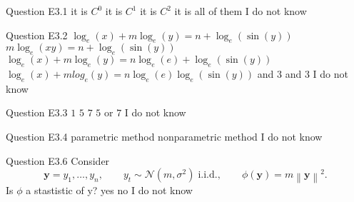 \begin{frame}{Question E3.1}
	\QuestionNotes{}
	\QuestionAnswers
	{
		\correctanswer it is $C^0$
		\answer it is $C^1$
		\answer it is $C^2$		
		\answer it is all of them
		\answer I do not know
	}
	\note<1->{\begin{itemize}
		\item 
	\end{itemize}}
\end{frame}

\begin{frame}{Question E3.2}
	\QuestionNotes{}
	\QuestionAnswers
	{
		\answer $\log_e(x)+m \log_e(y)=n+ \log_e(\sin(y))$
		\answer $m \log_e(xy)=n+\log_e(\sin(y))$
		\answer $\log_e(x)+m\log_e(y)=n \log_e(e) + \log_e(\sin(y))$
		\answer $\log_e(x)+mlog_e(y) = n \log_e(e) \log_e(\sin(y))$		
		 and 3 
		 and 3
		\answer I do not know
	}
\end{frame}

\begin{frame}{Question E3.3}
	\QuestionNotes{}
	\QuestionAnswers
	{
		\answer $1$
		\correctanswer $5$
		\answer $7$
		\answer $5$ or $7$		
		\answer I do not know 
	}
\end{frame}

\begin{frame}{Question E3.4}
	\QuestionNotes{}
	\QuestionAnswers
	{
		\correctanswer parametric method
		\answer nonparametric method
		\answer I do not know
	}
\end{frame}

\begin{frame}{Question E3.6}
	\QuestionNotes{}
	\QuestionBody
	{
		Consider
		$$
			\bm{y} = y_{1}, \ldots, y_{n},
			\qquad
			y_{t} \sim \mathcal{N} \left( m, \sigma^{2} \right) \; \text{i.i.d.},
			\qquad
			\phi \left( \bm{y} \right) = m \left\| \bm{y} \right\|^{2}.
		$$
		Is $\phi$ a stastistic of y?}
	\QuestionAnswers
	{
		\answer yes
		\correctanswer no
		\answer I do not know
	}
\end{frame}


